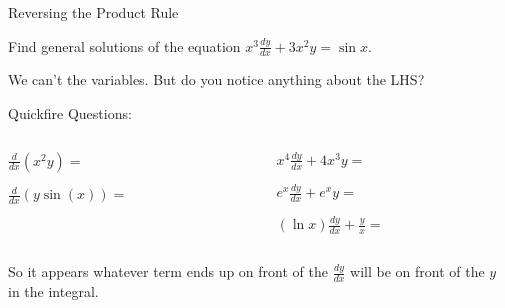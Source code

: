 \documentclass[8pt]{beamer}
\begin{document}
\begin{frame}{Reversing the Product Rule}
	\begin{problem}
		Find general solutions of the equation $x^3 \frac{dy}{dx}+ 3x^2y=\sin x$.
	\end{problem}

	We can't  the variables. But do you notice anything about the LHS?


	Quickfire Questions:

	\begin{columns}
		\begin{column}{.5\textwidth}
			$\frac{d}{dx}\left( x^2y \right) =$

			$\frac{d}{dx}\left( y\sin(x) \right) =$ 
	
\end{column}
\begin{column}{.5\textwidth}
	$x^{4} \frac{dy}{dx}+4 x^3y = $ 

		$e^x \frac{dy}{dx}+ e^x y=$ 
	
		$(\ln x) \frac{dy}{dx}+ \frac{y}{x}=$ 
\end{column}
		
	\end{columns}
	  
	\alert<5->{So it appears whatever term ends up on front of the $\frac{dy}{dx}$ will be on front of the $y$ in the integral.}
\end{frame}
\end{document}
